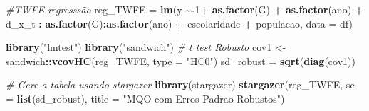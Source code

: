 \documentclass[portugues]{article}
\newenvironment{Shaded}{\begin{snugshade}}{\end{snugshade}}
\newcommand{\AttributeTok}[1]{\textcolor[rgb]{0.13,0.29,0.53}{#1}}
\newcommand{\CommentTok}[1]{\textcolor[rgb]{0.56,0.35,0.01}{\textit{#1}}}
\newcommand{\DecValTok}[1]{\textcolor[rgb]{0.00,0.00,0.81}{#1}}
\newcommand{\FunctionTok}[1]{\textcolor[rgb]{0.13,0.29,0.53}{\textbf{#1}}}
\newcommand{\NormalTok}[1]{#1}
\newcommand{\OtherTok}[1]{\textcolor[rgb]{0.56,0.35,0.01}{#1}}
\newcommand{\SpecialCharTok}[1]{\textcolor[rgb]{0.81,0.36,0.00}{\textbf{#1}}}
\newcommand{\StringTok}[1]{\textcolor[rgb]{0.31,0.60,0.02}{#1}}
\begin{document}
\begin{box_code}

\begin{Shaded}
\begin{Highlighting}[]
\CommentTok{\#TWFE regresssão}
\NormalTok{reg\_TWFE }\OtherTok{=} \FunctionTok{lm}\NormalTok{(y }\SpecialCharTok{\textasciitilde{}{-}}\DecValTok{1}\SpecialCharTok{+} \FunctionTok{as.factor}\NormalTok{(G) }\SpecialCharTok{+} \FunctionTok{as.factor}\NormalTok{(ano) }
\SpecialCharTok{+}\NormalTok{ d\_x\_t }\SpecialCharTok{:} \FunctionTok{as.factor}\NormalTok{(G)}\SpecialCharTok{:}\FunctionTok{as.factor}\NormalTok{(ano) }\SpecialCharTok{+}\NormalTok{ escolaridade }
\SpecialCharTok{+}\NormalTok{ populacao, }\AttributeTok{data =}\NormalTok{ df)}

\FunctionTok{library}\NormalTok{(}\StringTok{"lmtest"}\NormalTok{)}
\FunctionTok{library}\NormalTok{(}\StringTok{"sandwich"}\NormalTok{)}
\CommentTok{\# t test Robusto}
\NormalTok{cov1 }\OtherTok{\textless{}{-}}\NormalTok{ sandwich}\SpecialCharTok{::}\FunctionTok{vcovHC}\NormalTok{(reg\_TWFE, }\AttributeTok{type =} \StringTok{"HC0"}\NormalTok{)}
\NormalTok{sd\_robust }\OtherTok{=} \FunctionTok{sqrt}\NormalTok{(}\FunctionTok{diag}\NormalTok{(cov1))}

\CommentTok{\# Gere a tabela usando stargazer}
\FunctionTok{library}\NormalTok{(stargazer)}
\FunctionTok{stargazer}\NormalTok{(reg\_TWFE, }\AttributeTok{se =} \FunctionTok{list}\NormalTok{(sd\_robust),}
\AttributeTok{title =} \StringTok{"MQO com Erros Padrao Robustos"}\NormalTok{)}
\end{Highlighting}
\end{Shaded}


\end{box_code}
\end{document}
